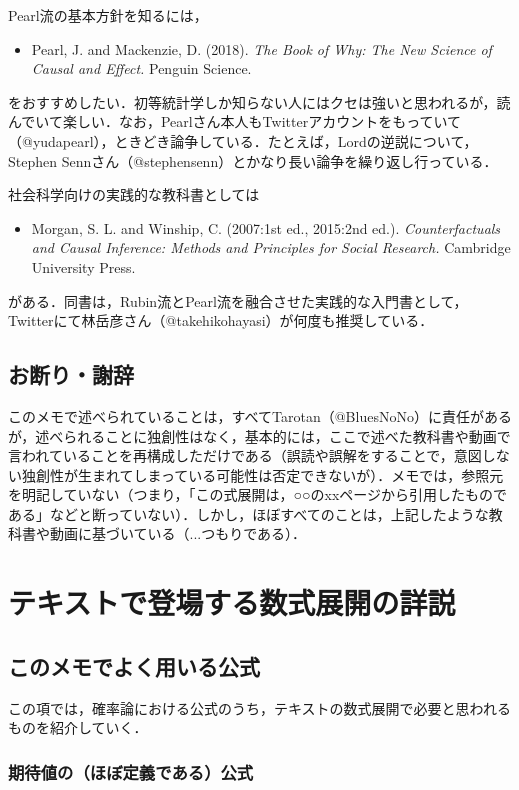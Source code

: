 \documentclass[12pt]{jsarticle}
\begin{document}
Pearl流の基本方針を知るには，
\begin{itemize}
\item[] Pearl, J. and Mackenzie, D. (2018). {\it The Book of Why: The New Science of Causal and Effect.} Penguin Science.
\end{itemize}
をおすすめしたい．初等統計学しか知らない人にはクセは強いと思われるが，読んでいて楽しい．なお，Pearlさん本人もTwitterアカウントをもっていて（@yudapearl），ときどき論争している．たとえば，Lordの逆説について，Stephen Sennさん（@stephensenn）とかなり長い論争を繰り返し行っている．

社会科学向けの実践的な教科書としては
\begin{itemize}
\item[] Morgan, S. L. and Winship, C. (2007:1st ed., 2015:2nd ed.). {\it Counterfactuals and Causal Inference: Methods and Principles for Social Research.} Cambridge University Press.
\end{itemize}
がある．同書は，Rubin流とPearl流を融合させた実践的な入門書として，Twitterにて林岳彦さん（@takehikohayasi）が何度も推奨している．


\subsection{お断り・謝辞}
このメモで述べられていることは，すべてTarotan（@BluesNoNo）に責任があるが，述べられることに独創性はなく，基本的には，ここで述べた教科書や動画で言われていることを再構成しただけである（誤読や誤解をすることで，意図しない独創性が生まれてしまっている可能性は否定できないが）．メモでは，参照元を明記していない（つまり，「この式展開は，○○のxxページから引用したものである」などと断っていない）．しかし，ほぼすべてのことは，上記したような教科書や動画に基づいている（...つもりである）．


\section{テキストで登場する数式展開の詳説}

\subsection{このメモでよく用いる公式}

この項では，確率論における公式のうち，テキストの数式展開で必要と思われるものを紹介していく．

\subsubsection{期待値の（ほぼ定義である）公式}\label{sec:exdef}
\end{document}
